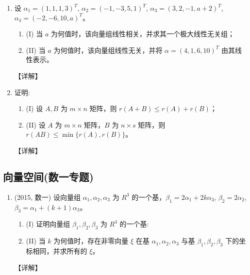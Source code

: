 \documentclass[12pt, a4paper, oneside, UTF8]{ctexbook}
\begin{document}
\begin{enumerate}[label=\arabic*.,start=6]
    \item 设 $\alpha_1 = (1,1,1,3)^T$, $\alpha_2 = (-1,-3,5,1)^T$, $\alpha_3 = (3,2,-1, a+2)^T$, $\alpha_4 = (-2,-6,10, a)^T$。
    \begin{enumerate}
        \item (I) 当 $a$ 为何值时，该向量组线性相关，并求其一个极大线性无关组；
        \item (II) 当 $a$ 为何值时，该向量组线性无关，并将 $\alpha = (4,1,6,10)^T$ 由其线性表示。
    \end{enumerate}
    
    \begin{solution}
    【详解】
    \end{solution}
    
    \item 证明:
    \begin{enumerate}
        \item (I) 设 $A, B$ 为 $m \times n$ 矩阵，则 $r(A+B) \leq r(A) + r(B)$；
        \item (II) 设 $A$ 为 $m \times n$ 矩阵，$B$ 为 $n \times s$ 矩阵，则 $r(AB) \leq \min\{r(A), r(B)\}$。
    \end{enumerate}
    
    \begin{solution}
    【详解】
    \end{solution}
\end{enumerate}

\subsection{向量空间(数一专题)}

\begin{enumerate}[label=\arabic*.,start=8]
    \item (2015, 数一) 设向量组 $\alpha_1, \alpha_2, \alpha_3$ 为 $R^3$ 的一个基，$\beta_1 = 2\alpha_1 + 2k\alpha_3$, $\beta_2 = 2\alpha_2$,
    $\beta_3 = \alpha_1 + (k+1)\alpha_3$。
    \begin{enumerate}
        \item (I) 证明向量组 $\beta_1, \beta_2, \beta_3$ 为 $R^3$ 的一个基:
        \item (II) 当 $k$ 为何值时，存在非零向量 $\xi$ 在基 $\alpha_1, \alpha_2, \alpha_3$ 与基 $\beta_1, \beta_2, \beta_3$ 下的坐标相同，并求所有的 $\xi$。
    \end{enumerate}
    
    \begin{solution}
    【详解】
    \end{solution}
\end{enumerate}
\end{document}
